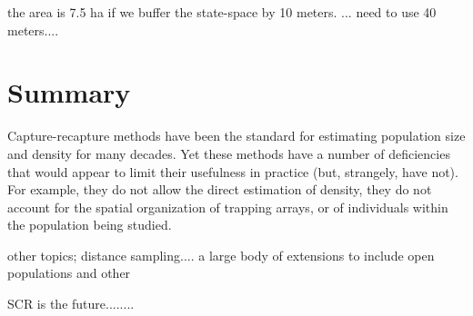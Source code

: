 \documentclass{book}
\begin{document}
the area is 7.5 ha if we buffer the state-space by 10 meters. ... need
to use 40 meters....






\section{Summary}

Capture-recapture methods have been the standard for estimating
population size and density for many decades.  Yet these methods have
a number of deficiencies that would appear to limit their usefulness
in practice (but, strangely, have not). For example, they do not allow
the direct estimation of density, they do not account for the spatial
organization of trapping arrays, or of individuals within the
population being studied. 

other topics; distance sampling....
a large body
of extensions to include open populations and other 

SCR is the future........
\end{document}
